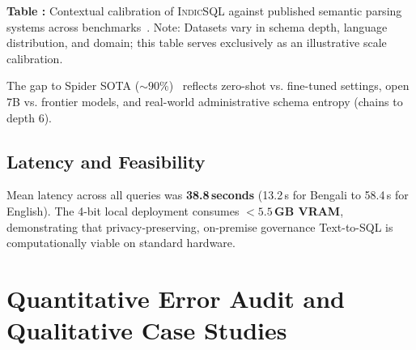 \documentclass[conference]{IEEEtran}
\begin{document}
\begin{table}[htbp]
\centering
\renewcommand{\arraystretch}{1.25}
\vspace{6pt}
\label{tab:contextual_baselines}
\begin{flushleft}
\small\textbf{Table \thetable:} Contextual calibration of \textsc{IndicSQL} against published semantic parsing systems across benchmarks~\cite{herzig2020tapas, shi2022mt5, gao2023gpt4, dawar2026indicdbbench}. Note: Datasets vary in schema depth, language distribution, and domain; this table serves exclusively as an illustrative scale calibration.
\end{flushleft}
\end{table}

The gap to Spider SOTA ($\sim 90\%$)~\cite{yu2018spider, pourreza2023dinsql} reflects zero-shot vs. fine-tuned settings, open 7B vs. frontier models, and real-world administrative schema entropy (chains to depth 6).

\subsection{Latency and Feasibility}
Mean latency across all queries was \textbf{38.8\,seconds} (13.2\,s for Bengali to 58.4\,s for English). The 4-bit local deployment consumes \textbf{$<5.5$\,GB VRAM}, demonstrating that privacy-preserving, on-premise governance Text-to-SQL is computationally viable on standard hardware.

\section{Quantitative Error Audit and Qualitative Case Studies}\label{sec:error_audit}
\end{document}

